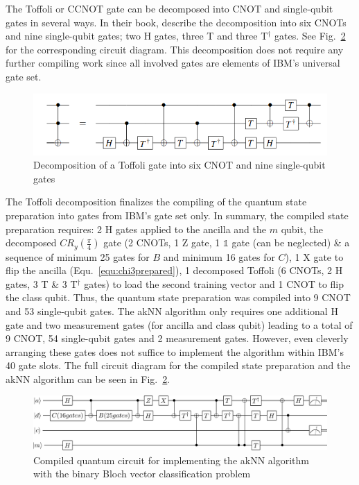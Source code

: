 The Toffoli or CCNOT gate can be decomposed into CNOT and single-qubit gates in several ways. In their book, describe the decomposition into six CNOTs and nine single-qubit gates; two H gates, three T and three T$^\dagger$ gates. See Fig.~\ref{img:toffolidecomp} for the corresponding circuit diagram. This decomposition does not require any further compiling work since all involved gates are elements of IBM's universal gate set.

\begin{figure}[!ht]
       \centering
       \includegraphics[scale=0.5]{img/toffolidecomposition.png}
       \caption[]{\label{img:toffolidecomp} Decomposition of a Toffoli gate into six CNOT and nine single-qubit gates\footnotemark[16]}
\end{figure}


The Toffoli decomposition finalizes the compiling of the quantum state preparation into gates from IBM's gate set only. In summary, the compiled state preparation requires: 2 H gates applied to the ancilla and the $m$ qubit, the decomposed $CR_y(\frac{\pi}{4})$ gate (2 CNOTs, 1 Z gate, 1 $\mathbb{1}$ gate (can be neglected) \& a sequence of minimum 25 gates for $B$ and minimum 16 gates for $C$), 1 X gate to flip the ancilla (Equ.~\ref{equ:chi3prepared}), 1 decomposed Toffoli (6 CNOTs, 2 H gates, 3 T \& 3 T$^\dagger$ gates) to load the second training vector and 1 CNOT to flip the class qubit. Thus, the quantum state preparation was compiled into 9 CNOT and 53 single-qubit gates. The akNN algorithm only requires one additional H gate and two measurement gates (for ancilla and class qubit) leading to a total of 9 CNOT, 54 single-qubit gates and 2 measurement gates. However, even cleverly arranging these gates does not suffice to implement the algorithm within IBM's 40 gate slots. The full circuit diagram for the compiled state preparation and the akNN algorithm can be seen in Fig.~\ref{img:toffolidecomp}.

\begin{figure}[!ht]
       \centering
       \includegraphics[width=\textwidth]{img/fullQKNN.png}
       \caption[]{\label{img:toffolidecomp} Compiled quantum circuit for implementing the akNN algorithm with the binary Bloch vector classification problem}
\end{figure}

